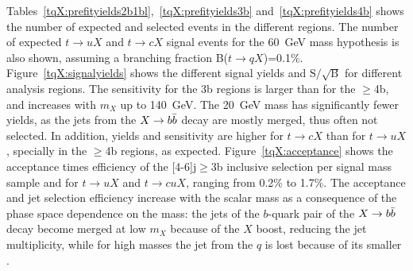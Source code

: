 Tables~\ref{tqX:prefityields2b1bl},~\ref{tqX:prefityields3b} and~\ref{tqX:prefityields4b} shows the number of expected and selected events in the different regions. The number of expected $t\to uX$ and $t\to cX$ signal events for the 60~GeV mass hypothesis is also shown, assuming a branching fraction B($t\to qX$)=0.1\%. Figure~\ref{tqX:signalyields} shows the different signal yields and $\text{S}/\sqrt{\text{B}}$ for different analysis regions. The sensitivity for the 3b regions is larger than for the $\geq$4b, and increases with $m_{X}$ up to 140~GeV. The 20~GeV mass has significantly fewer yields, as the jets from the $X\to b\bar{b}$ decay are mostly merged, thus often not selected. In addition, yields and sensitivity are higher for $t\to cX$ than for $t\to uX$, specially in the $\geq$4b regions, as expected. Figure~\ref{tqX:acceptance} shows the acceptance times efficiency of the [4-6]j$\geq$3b inclusive selection per signal mass sample and for $t\to uX$ and $t\to cuX$, ranging from 0.2\% to 1.7\%. The acceptance and jet selection efficiency increase with the scalar mass as a consequence of the phase space dependence on the mass: the jets of the $b$-quark pair of the $X\to b\bar{b}$ decay become merged at low $m_X$ because of the $X$ boost, reducing the jet multiplicity, while for high masses the jet from the $q$ is lost because of its smaller \pT.

